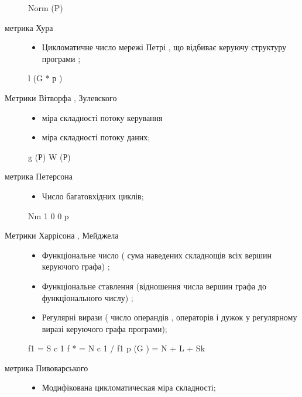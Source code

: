 \documentclass[oneside,final,14pt]{extreport}
\begin{document}
\begin{description}
\begin{itemize}
\end{itemize}

Norm (P)

\item[{метрика Хура}] \leavevmode\begin{itemize}
\item {} 
Цикломатичне число мережі Петрі , що відбиває керуючу структуру програми ;

\end{itemize}

l (G * р )

\item[{Метрики Вітворфа , Зулевского}] \leavevmode\begin{itemize}
\item {} 
міра складності потоку керування

\item {} 
міра складності потоку даних;

\end{itemize}

g (Р)
W (Р)

\item[{метрика Петерсона}] \leavevmode\begin{itemize}
\item {} 
Число багатовхідних циклів;

\end{itemize}

Nm 1 0 0 p

\item[{Метрики Харрісона , Мейджела}] \leavevmode\begin{itemize}
\item {} 
Функціональне число ( сума наведених складнощів всіх вершин керуючого графа) ;

\item {} 
Функціональне ставлення (відношення числа вершин графа до функціонального числу) ;

\item {} 
Регулярні вирази ( число операндів , операторів і дужок у регулярному виразі керуючого графа програми);

\end{itemize}

f1 = S c 1
f * = N c 1 / f1
p (G ) = N + L + Sk

\item[{метрика Пивоварського}] \leavevmode\begin{itemize}
\item {} 
Модифікована цикломатическая міра складності;


\end{itemize}
\end{description}
\end{document}
